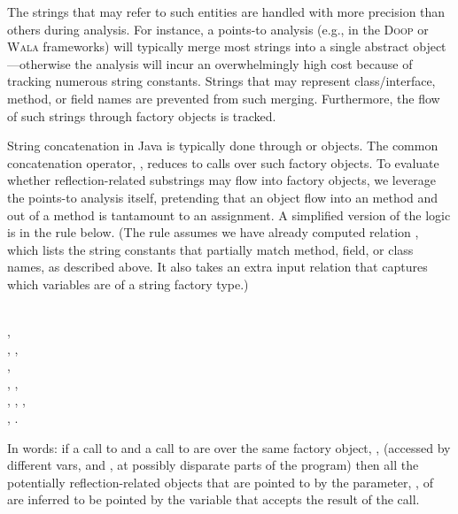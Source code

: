 The strings that may refer to such entities are handled with more
precision than others during analysis. For instance, a points-to
analysis (e.g., in the \textsc{Doop} or \textsc{Wala} frameworks) will
typically merge most strings into a single abstract object---otherwise
the analysis will incur an overwhelmingly high cost because of tracking numerous
string constants. Strings that may represent class/interface, method,
or field names are prevented from such merging. Furthermore, the flow
of such strings through factory objects is tracked.

String concatenation in Java is typically done through
 or  objects. The
common concatenation operator, \code{+}, reduces to calls over
such factory objects. To evaluate whether reflection-related
substrings may flow into factory objects, we leverage the points-to
analysis itself, pretending that an object flow into an 
method and out of a  method is tantamount to an
assignment. A simplified version of the logic is in the rule below.
(The rule assumes we have already computed relation
, which lists the string constants that
partially match method, field, or class names, as described above. It
also takes an extra input relation 
that captures which variables are of a string factory type.)

\begin{minipage}{0.95\columnwidth}
  \begin{rules}
      \\
    \tab {}, \\
    \tab {}, , \\
    \tab {}, \\
    \tab {}, , \\
    \tab {}, , , \\
    \tab {}, .\\
  \end{rules}
\end{minipage}

\noindent In words: if a call to  and a call to  are
over the same factory object, , (accessed by different
vars,  and , at possibly disparate parts of
the program) then all the potentially reflection-related objects that
are pointed to by the parameter, , of  are inferred
to be pointed by the variable  that accepts the result of the
 call.

